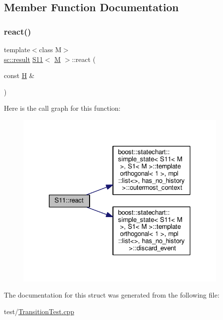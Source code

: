 \subsection{Member Function Documentation}
\mbox{\label{struct_s11_a7f4d3c9eb734b105d66f182c768cf324}} 
\subsubsection{\texorpdfstring{react()}{react()}}
{\footnotesize\ttfamily template$<$class M$>$ \\
\mbox{\hyperlink{namespaceboost_1_1statechart_abe807f6598b614d6d87bb951ecd92331}{sc\+::result}} \mbox{\hyperlink{struct_s11}{S11}}$<$ \mbox{\hyperlink{struct_m}{M}} $>$\+::react (\begin{DoxyParamCaption}\item[{const \mbox{\hyperlink{struct_h}{H}} \&}]{ }\end{DoxyParamCaption})\hspace{0.3cm}{\ttfamily [inline]}}

Here is the call graph for this function\+:
\nopagebreak
\begin{figure}[H]
\begin{center}
\leavevmode
\includegraphics[width=297pt]{struct_s11_a7f4d3c9eb734b105d66f182c768cf324_cgraph}
\end{center}
\end{figure}


The documentation for this struct was generated from the following file\+:\begin{DoxyCompactItemize}
\item 
test/\mbox{\hyperlink{_transition_test_8cpp}{Transition\+Test.\+cpp}}\end{DoxyCompactItemize}
